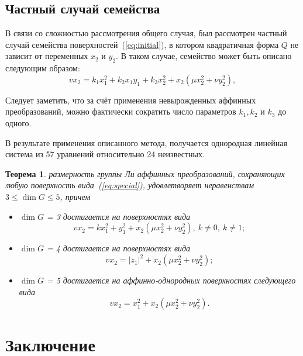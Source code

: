 \documentclass[a4paper,14pt]{extarticle}
\newtheorem{theorem}{Теорема}
\begin{document}
\subsection{Частный случай семейства}
В связи со сложностью рассмотрения общего случая, был рассмотрен частный случай семейства поверхностей~(\ref{eq:initial}), в котором квадратичная форма $Q$ не зависит от переменных $x_2$ и $y_2$. В таком случае, семейство может быть описано следующим образом:
\begin{equation}\label{eq:special}
v x_2 = k_1 x_1^2 + k_2 x_1 y_1 + k_3 x_2^2 + x_2 (\mu x_2^2 + \nu y_2^2),
\end{equation}

Следует заметить, что за счёт применения невырожденных аффинных преобразований, можно фактически сократить число параметров $k_1, k_2$ и $k_3$ до одного.

В результате применения описанного метода, получается однородная линейная система из 57 уравнений относительно 24 неизвестных.

\begin{theorem} размерность группы Ли аффинных преобразований, сохраняющих любую поверхность вида~(\ref{eq:special}), удовлетворяет неравенствам
$3 \le \dim G \le 5$, причем
\begin{itemize}
	\item $\dim G$ = 3 достигается на поверхностях вида
	\begin{equation}\label{eq:special_3}
		v x_2 = k x_1^2 + y_1^2 + x_2 (\mu x_2^2 + \nu y_2^2),\ k \ne 0, \ k \ne 1;
	\end{equation}
	\item $\dim G$ = 4 достигается на поверхностях вида
	\begin{equation}\label{eq:special_4}
		v x_2 = |z_1|^2 + x_2 (\mu x_2^2 + \nu y_2^2);
	\end{equation}
		\item $\dim G$ = 5 достигается на аффинно-однородных поверхностях следующего вида
	\begin{equation}\label{eq:special_5}
		v x_2 = x_1^2 + x_2 (\mu x_2^2 + \nu y_2^2).
	\end{equation}
\end{itemize}
\end{theorem}


\section*{\centering Заключение}
\lipsum[12-13]
\end{document}
